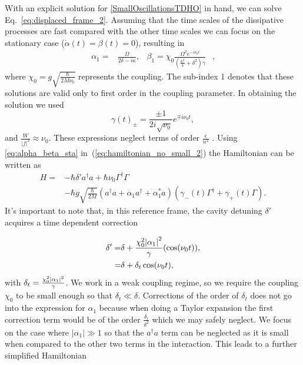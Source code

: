 \documentclass[reprint, amsmath,amssymb, aps,pra]{revtex4-1}
\begin{document}
With an explicit solution for \eqref{SmallOscillationsTDHO} in hand,
we can solve Eq.~\eqref{eq:displaced_frame_2}. Assuming that the time
scales of the dissipative processes are fast compared with the other
time scales we can focus on the stationary case
($\dot{\alpha}(t)=\dot{\beta}(t)=0$), resulting in
\begin{align}\label{eq:alpha_beta_sta}
\alpha_1 =& \frac{\Omega}{2\delta-i\kappa},& \beta_1 =\chi_0\frac{\Omega^2 e^{-i\nu_0 t}}{(\frac{\kappa^2}{4}+\delta^2)\gamma}& ,
\end{align} where  $\chi_0 = g\sqrt{\frac{\hbar}{2M\nu_0}}$ represents the coupling.
The  sub-index 1 denotes that these solutions are valid only to first
order in the coupling parameter.  In obtaining the solution we used
\begin{equation}\label{GammaCoefficients}
\gamma(t)_\pm= \frac{\pm 1}{2i\sqrt{\nu_0}}e^{\mp i\nu_0 t},
\end{equation}
and  $\frac{W}{|f|^2} \approx \nu_0$. These expressions neglect terms of order $\frac{\epsilon}{n^2}$ . Using \eqref{eq:alpha_beta_sta} in~(\ref{eq:hamiltonian_no_small_2})
the Hamiltonian can be written as
\begin{align}
H =& -\hbar \delta' a^{\dagger}a +\hbar\nu_0\Gamma^{\dagger}\Gamma \\
&-\hbar g\sqrt{\frac{\hbar}{2M}}(a^{\dagger}a +\alpha_1 a^{\dagger}+\alpha^*_1 a)(\gamma_-(t)\Gamma^{\dagger}+\gamma_+(t)\Gamma)\nonumber.
\end{align} It's important to note that, in this reference frame, the cavity detuning $\delta'$ acquires a time dependent correction 

\begin{align}
\delta' =& \delta +\frac{\chi_0^2 \abs{\alpha_1}^2}{\gamma} (\cos(\nu_0 t)), \nonumber\\
=& \delta + \delta_t\cos(\nu_0 t),
\end{align}
with $\delta_t=\frac{\chi_0^2 \abs{\alpha_1}^2}{\gamma}$. We work in a
weak coupling regime, so we require the coupling $\chi_0$ to be small
enough so that $\delta_t\ll\delta$. Corrections of the order of
$\delta_t$ does not go into the expression for $\alpha_1$ because when
doing a Taylor expansion the first correction term would be of the
order $\frac{\delta_t}{\delta^2}$ which we may safely neglect. We
focus on the case where $|\alpha_1| \gg 1$ \cite{BarberisLC} so that
the $a^\dagger a$ term can be neglected as it is small when compared
to the other two terms in the interaction. This leads to a further
simplified Hamiltonian
\end{document}

